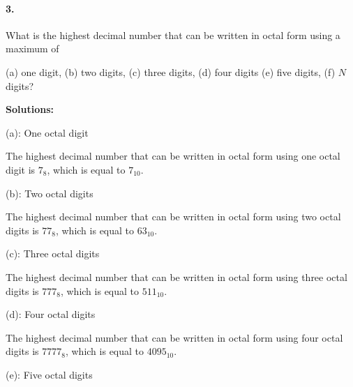 \documentclass{article}
\begin{document}
\paragraph*{3.}

What is the highest decimal number that can be written in octal form using a maximum of 

(a) one digit, (b) two digits, (c) three digits, (d) four digits (e) five digits, (f) $N$ digits?

\vspace*{0.5cm}

\noindent \textbf{Solutions:}

\vspace*{0.25cm}

\noindent (a): One octal digit

\vspace*{0.25cm}

\noindent The highest decimal number that can be written in octal form using one octal digit is $7_8$, which is equal to $7_{10}$.

\vspace*{0.5cm}

\noindent (b): Two octal digits

\vspace*{0.25cm}

\noindent The highest decimal number that can be written in octal form using two octal digits is $77_8$, which is equal to $63_{10}$.

\vspace*{0.5cm}

\noindent (c): Three octal digits

\vspace*{0.25cm}

\noindent The highest decimal number that can be written in octal form using three octal digits is $777_8$, which is equal to $511_{10}$.

\vspace*{0.5cm}

\noindent (d): Four octal digits

\vspace*{0.25cm}

\noindent The highest decimal number that can be written in octal form using four octal digits is $7777_8$, which is equal to $4095_{10}$.

\vspace*{0.5cm}

\noindent (e): Five octal digits
\end{document}
